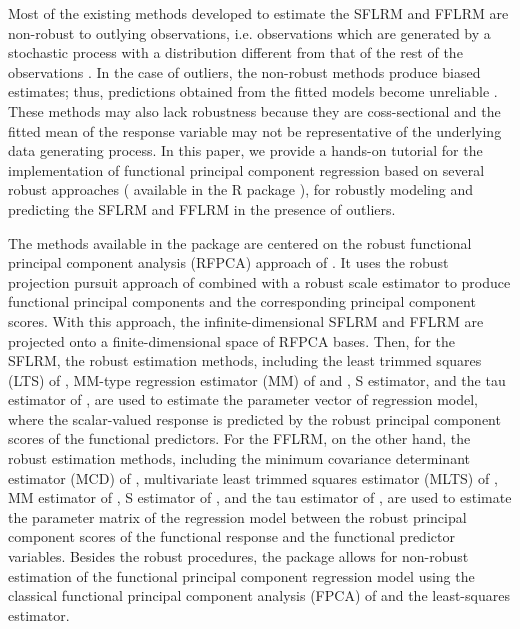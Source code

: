 Most of the existing methods developed to estimate the SFLRM and FFLRM are non-robust to outlying observations, i.e. observations which are generated by a stochastic process with a distribution different from that of the rest of the observations \citep[see, e.g.,][]{Rana}. In the case of outliers, the non-robust methods produce biased estimates; thus, predictions obtained from the fitted models become unreliable \citep[see, e.g.,][]{zhu2011, Maronna, ShinLee, Kalogridis, Boente2020, Harjit, BSchem}. These methods may also lack robustness because they are coss-sectional and the fitted mean of the response variable may not be representative of the underlying data generating process. In this paper, we provide a hands-on tutorial for the implementation of functional principal component regression based on several robust approaches ( available in the \textsf{R} package ), for robustly modeling and predicting the SFLRM and FFLRM in the presence of outliers.

The methods available in the  package are centered on the robust functional principal component analysis (RFPCA) approach of \cite{Bali2011}. It uses the robust projection pursuit approach of \cite{croux96} combined with a robust scale estimator to produce functional principal components and the corresponding principal component scores. With this approach, the infinite-dimensional SFLRM and FFLRM are projected onto a finite-dimensional space of RFPCA bases. Then, for the SFLRM, the robust estimation methods, including the least trimmed squares (LTS) of \cite{Rousseeuw1984}, MM-type regression estimator (MM) of \cite{Yohai1987} and \cite{Koller2011}, S estimator, and the tau estimator of \cite{Salibian2008}, are used to estimate the parameter vector of regression model, where the scalar-valued response is predicted by the robust principal component scores of the functional predictors. For the FFLRM, on the other hand, the robust estimation methods, including the minimum covariance determinant estimator (MCD) of \cite{Rousseeuwetal1984}, multivariate least trimmed squares estimator (MLTS) of \cite{Agullo2008}, MM estimator of \cite{Kudraszow2011}, S estimator of \cite{Bilo2000}, and the tau estimator of \cite{Ben2006}, are used to estimate the parameter matrix of the regression model between the robust principal component scores of the functional response and the functional predictor variables. Besides the robust procedures, the package  allows for non-robust estimation of the functional principal component regression model using the classical functional principal component analysis (FPCA) of \cite{ramsay2006} and the least-squares estimator.

